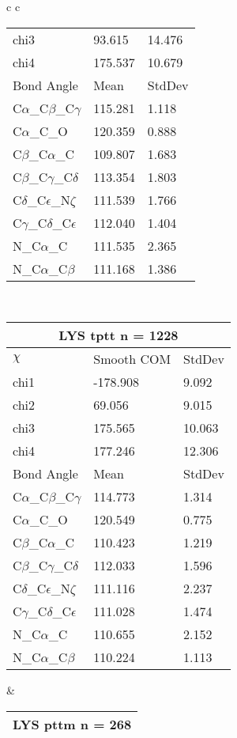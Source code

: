 \begin{longtable}{ c c }
\begin{tabular}{ l l l }
  chi3 & 93.615 & 14.476 \\ 
  chi4 & 175.537 & 10.679 \\ \midrule
  Bond Angle   & Mean     & StdDev \\ \midrule
  C$\alpha$\_C$\beta$\_C$\gamma$ & 115.281 & 1.118\\
  C$\alpha$\_C\_O & 120.359 & 0.888\\
  C$\beta$\_C$\alpha$\_C & 109.807 & 1.683\\
  C$\beta$\_C$\gamma$\_C$\delta$ & 113.354 & 1.803\\
  C$\delta$\_C$\epsilon$\_N$\zeta$ & 111.539 & 1.766\\
  C$\gamma$\_C$\delta$\_C$\epsilon$ & 112.040 & 1.404\\
  N\_C$\alpha$\_C & 111.535 & 2.365\\
  N\_C$\alpha$\_C$\beta$ & 111.168 & 1.386\\
  \bottomrule
  \end{tabular}
  \\
  \begin{tabular}{ l l l }
  \toprule
  \multicolumn{3}{c}{LYS \textbf{tptt} n = 1228} \\ \toprule
  $\chi$       & Smooth COM & StdDev \\ \midrule
  chi1 & -178.908 & 9.092 \\ 
  chi2 & 69.056 & 9.015 \\ 
  chi3 & 175.565 & 10.063 \\ 
  chi4 & 177.246 & 12.306 \\ \midrule
  Bond Angle   & Mean     & StdDev \\ \midrule
  C$\alpha$\_C$\beta$\_C$\gamma$ & 114.773 & 1.314\\
  C$\alpha$\_C\_O & 120.549 & 0.775\\
  C$\beta$\_C$\alpha$\_C & 110.423 & 1.219\\
  C$\beta$\_C$\gamma$\_C$\delta$ & 112.033 & 1.596\\
  C$\delta$\_C$\epsilon$\_N$\zeta$ & 111.116 & 2.237\\
  C$\gamma$\_C$\delta$\_C$\epsilon$ & 111.028 & 1.474\\
  N\_C$\alpha$\_C & 110.655 & 2.152\\
  N\_C$\alpha$\_C$\beta$ & 110.224 & 1.113\\
  \bottomrule
  \end{tabular}
  &
  \begin{tabular}{ l l l }
  \toprule
  \multicolumn{3}{c}{LYS \textbf{pttm} n = 268} \\ \toprule

\end{tabular}
\end{longtable}
